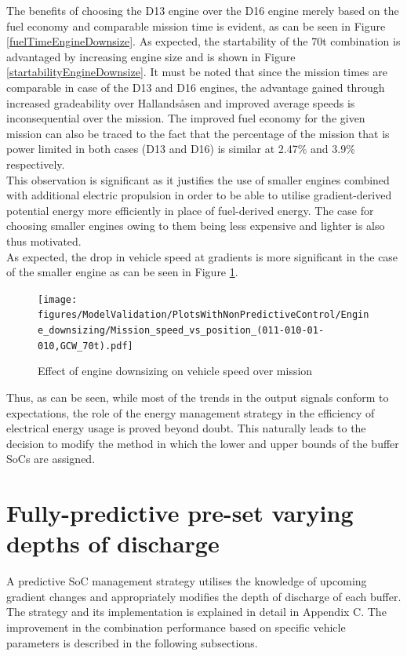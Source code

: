 \documentclass[ExampleMasters.tex]{subfiles}
\begin{document}
The benefits of choosing the D13 engine over the D16 engine merely based on the fuel economy and comparable mission time is evident, as can be seen in Figure \ref{fuelTimeEngineDownsize}. As expected, the startability of the 70t combination is advantaged by increasing engine size and is shown in Figure \ref{startabilityEngineDownsize}. It must be noted that since the mission times are comparable in case of the D13 and D16 engines, the advantage gained through increased gradeability over Hallands\aa sen and improved average speeds is inconsequential over the mission. The improved fuel economy for the given mission can also be traced to the fact that the percentage of the mission that is power limited in both cases (D13 and D16)  is similar at 2.47\% and 3.9\% respectively.\\

This observation is significant as it justifies the use of smaller engines combined with additional electric propulsion in order to be able to utilise gradient-derived potential energy more efficiently in place of fuel-derived energy. The case for choosing smaller engines owing to them being less expensive and lighter is also thus motivated.\\

As expected, the drop in vehicle speed at gradients is more significant in the case of the smaller engine as can be seen in Figure \ref{speedEngineDownsizing}.\\

\begin{figure}[h!]
\centering
\texttt{[image: figures/ModelValidation/PlotsWithNonPredictiveControl/Engine\_downsizing/Mission\_speed\_vs\_position\_(011-010-01-010,GCW\_70t).pdf]}
\caption{Effect of engine downsizing on vehicle speed over mission}
\label{speedEngineDownsizing}
\end{figure}


Thus, as can be seen, while most of the trends in the output signals conform to expectations, the role of the energy management strategy in the efficiency of electrical energy usage is proved beyond doubt. This naturally leads to the decision to modify the method in which the lower and upper bounds of the buffer SoCs are assigned. 

\section{Fully-predictive pre-set varying depths of discharge}
A predictive SoC management strategy utilises the knowledge of upcoming gradient changes and appropriately modifies the depth of discharge of each buffer. The strategy and its implementation is explained in detail in Appendix C. The improvement in the combination performance based on specific vehicle parameters is described in the following subsections.
\end{document}
